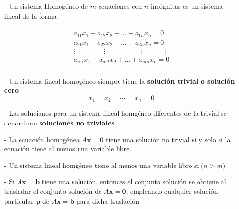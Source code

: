 \documentclass{article}
\begin{document}
\pagebreak

\begin{tcolorbox}[colback=red!10!white, colframe=red!70!black, title=Resumen]
    \begin{itemize}
        \item[-] Un sistema Homogéneo de $m$ ecuaciones con $n$ incógnitas es un sistema lineal de la forma
        \item[] \begin{equation*}
            \begin{matrix}
                \begin{aligned}
                    a_{11}x_1 + a_{12}x_2 + \dots + a_{1n}x_n = 0\\
                    a_{21}x_1 + a_{22}x_2 + \dots + a_{2n}x_n = 0\\
                    \vdots \phantom{aaaaaaaa} \vdots \phantom{aaaaaaaaaa} \vdots \phantom{aaaaaa} \vdots\\
                    a_{m1}x_1 + a_{m2}x_2 + \dots + a_{mn}x_n = 0\\
                \end{aligned}
            \end{matrix}
        \end{equation*}

        \item[-] Un sistema lineal homogéneo siempre tiene la \textbf{solución trivial o solución cero} $$x_1 = x_2 = \dotsb = x_n = 0$$
        \item[-] Las soluciones para un sistema lineal homgéneo diferentes de la trivial se denominan \textbf{soluciones no triviales}
        \item[-] La ecuación homogénea $A\mathbf{x} = 0$ tiene una solución no trivial si y solo si la ecuación tiene al menos una variable libre. 
        \item[-] Un sistema lineal homgéneo tiene al menos una variable libre si ($n > m$)  
        \item[-] Si $A\mathbf{x} = \mathbf{b}$ tiene una solución, entonces el conjunto solución se obtiene al trasladar el conjunto solución de $A\mathbf{x} = \mathbf{0}$, empleando cualquier solución particular $\mathbf{p}$ de $A\mathbf{x} = \mathbf{b}$ para dicha traslación 
    \end{itemize}
\end{tcolorbox}


\end{document}
